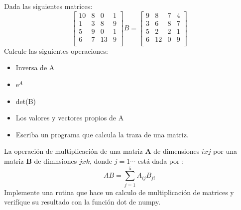 \documentclass[5pt]{exam}
\begin{document}
{\begin{questions}
\item Dada las siguientes matrices:
\[
\begin{bmatrix}
      10  & 8  & 0 &  1  \\
      1   &  3 & 8 &  9 \\
      5   &  9 & 0 &  1 \\
      6   &  7 & 13 & 9 \\
\end{bmatrix}
B =
\begin{bmatrix}
      9  & 8  & 7 &  4  \\
      3   &  6 & 8 &  7 \\
      5   &  2 & 2 &  1 \\
      6   &  12 & 0 & 9 \\
\end{bmatrix}
\]
Calcule las siguientes operaciones:
\begin{itemize}
    \item Inversa de A
    \item   e$^A$
    \item det(B)
    \item Los valores y vectores propios de A
    \item Escriba un programa que calcula la traza de una matriz.
\end{itemize}

\item La operación de multiplicación de una matriz \textbf{A} de dimensiones $ixj$ por una  matriz \textbf{B} de 
dimnsiones $jxk$, donde $j=1\dotsm $  está dada por :
\begin{equation}
    \label{} AB = \sum_{j=1}^5 A_{ij}B_{ji}
\end{equation}
Implemente una rutina que hace un calculo de multiplicación de matrices y verifíque su resultado con la función
dot de numpy.


\end{questions}}
\end{document}
